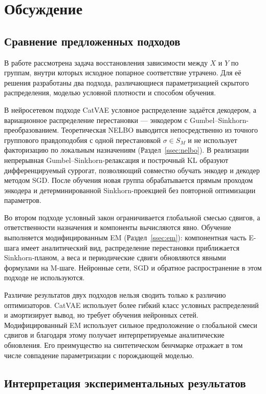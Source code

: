 \section{Обсуждение}
\label{sec:Discussion}

\subsection{Сравнение предложенных подходов}

В работе рассмотрена задача восстановления зависимости между $X$ и $Y$ по группам, внутри
которых исходное попарное соответствие утрачено. Для её решения разработаны два подхода,
различающиеся параметризацией скрытого распределения, моделью условной плотности и способом
обучения.

В нейросетевом подходе CatVAE условное распределение задаётся декодером, а вариационное
распределение перестановки --- энкодером с Gumbel--Sinkhorn-преобразованием. Теоретическая
NELBO выводится непосредственно из точного группового правдоподобия с одной перестановкой
$\sigma\in S_M$ и не использует факторизацию по локальным назначениям
(Раздел~\ref{ssec:nelbo}). В реализации непрерывная Gumbel--Sinkhorn-релаксация и
построчный KL образуют дифференцируемый суррогат, позволяющий совместно обучать энкодер и
декодер методом SGD. После обучения новая группа обрабатывается прямым проходом энкодера и
детерминированной Sinkhorn-проекцией без повторной оптимизации параметров.

Во втором подходе условный закон ограничивается глобальной смесью сдвигов, а
ответственности назначения и компоненты вычисляются явно. Обучение выполняется
модифицированным EM (Раздел~\ref{ssec:em}): компонентная часть E-шага имеет аналитический
вид, распределение перестановки приближается Sinkhorn-планом, а веса и периодические сдвиги
обновляются явными формулами на M-шаге. Нейронные сети, SGD и обратное распространение в
этом подходе не используются.

Различие результатов двух подходов нельзя сводить только к различию оптимизаторов. CatVAE
использует более гибкий класс условных распределений и амортизирует вывод, но требует
обучения нейронных сетей. Модифицированный EM использует сильное предположение о глобальной
смеси сдвигов и благодаря этому получает интерпретируемые аналитические обновления. Его
преимущество на синтетическом бенчмарке отражает в том числе совпадение параметризации с
порождающей моделью.

\subsection{Интерпретация экспериментальных результатов}

